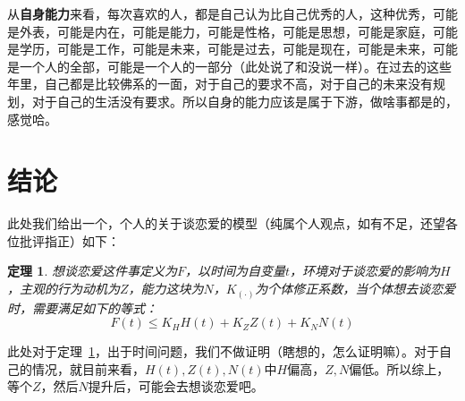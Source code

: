 \documentclass{article}
\newtheorem{theorem}{定理}
\begin{document}
从\textbf{自身能力}来看，每次喜欢的人，都是自己认为比自己优秀的人，这种优秀，可能是外表，可能是内在，可能是能力，可能是性格，可能是思想，可能是家庭，可能是学历，可能是工作，可能是未来，可能是过去，可能是现在，可能是未来，可能是一个人的全部，可能是一个人的一部分（此处说了和没说一样）。在过去的这些年里，自己都是比较佛系的一面，对于自己的要求不高，对于自己的未来没有规划，对于自己的生活没有要求。所以自身的能力应该是属于下游，做啥事都是的，感觉哈。

\section{结论}
此处我们给出一个，个人的关于谈恋爱的模型（纯属个人观点，如有不足，还望各位批评指正）如下：

\begin{theorem}
    \label{thm:love}
    想谈恋爱这件事定义为$F$，以时间为自变量$t$，环境对于谈恋爱的影响为$H$，主观的行为动机为$Z$，能力这块为$N$，$K_{(\cdot)}$为个体修正系数，当个体想去谈恋爱时，需要满足如下的等式：
    \begin{equation}
        F(t) \le K_{H}H(t) + K_{Z}Z(t) + K_{N}N(t)
    \end{equation}
\end{theorem}

此处对于定理~\ref{thm:love}，出于时间问题，我们不做证明（瞎想的，怎么证明嘛）。对于自己的情况，就目前来看，$H(t),Z(t),N(t)$中$H$偏高，$Z,N$偏低。所以综上，等个$Z$，然后$N$提升后，可能会去想谈恋爱吧。
\end{document}
